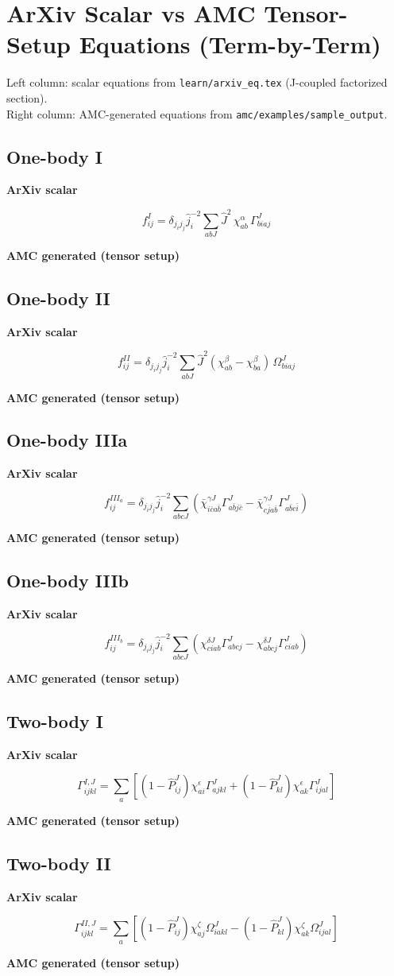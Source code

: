 \documentclass[11pt]{article}
\newcommand{\CompareBlock}[3]{%
\subsection*{#1}
\noindent
\begin{minipage}[t]{0.48\textwidth}
\textbf{ArXiv scalar}
#2
\end{minipage}\hfill
\begin{minipage}[t]{0.48\textwidth}
\textbf{AMC generated (tensor setup)}

\end{minipage}
\vspace{1em}
}
\begin{document}
\small

\section*{ArXiv Scalar vs AMC Tensor-Setup Equations (Term-by-Term)}

Left column: scalar equations from \texttt{learn/arxiv_eq.tex} (J-coupled factorized section).\\
Right column: AMC-generated equations from \texttt{amc/examples/sample_output}.

\CompareBlock{One-body I}{
\begin{equation*}
 f^{I}_{ij}=\delta_{j_i j_j}\hat j_i^{-2}\sum_{abJ}\hat J^2\,\chi^{\alpha}_{ab}\,\Gamma^J_{biaj}
\end{equation*}
}{amc_eq_snippets_clean/dc_f1_tensor_clean_body.tex}

\CompareBlock{One-body II}{
\begin{equation*}
 f^{II}_{ij}=\delta_{j_i j_j}\hat j_i^{-2}\sum_{abJ}\hat J^2(\chi^{\beta}_{ab}-\chi^{\beta}_{ba})\,\Omega^J_{biaj}
\end{equation*}
}{amc_eq_snippets_clean/dc_f2_tensor_clean_body.tex}

\CompareBlock{One-body IIIa}{
\begin{equation*}
 f^{III_a}_{ij}=\delta_{j_i j_j}\hat j_i^{-2}\sum_{abcJ}
\left(\bar\chi^{\gamma J}_{i\bar c a\bar b}\Gamma^J_{a\bar b j\bar c}-\bar\chi^{\gamma J}_{c\bar j a\bar b}\Gamma^J_{a\bar b c\bar i}\right)
\end{equation*}
}{amc_eq_snippets_clean/dc_f3a_tensor_clean_body.tex}

\CompareBlock{One-body IIIb}{
\begin{equation*}
 f^{III_b}_{ij}=\delta_{j_i j_j}\hat j_i^{-2}\sum_{abcJ}
\left(\chi^{\delta J}_{ciab}\Gamma^J_{abcj}-\chi^{\delta J}_{abcj}\Gamma^J_{ciab}\right)
\end{equation*}
}{amc_eq_snippets_clean/dc_f3b_tensor_body.tex}

\CompareBlock{Two-body I}{
\begin{equation*}
\Gamma^{I,J}_{ijkl}=\sum_a\left[(1-\hat P^J_{ij})\chi^{\epsilon}_{ai}\Gamma^J_{ajkl}+(1-\hat P^J_{kl})\chi^{\epsilon}_{ak}\Gamma^J_{ijal}\right]
\end{equation*}
}{amc_eq_snippets_clean/dc_G1_tensor_clean_body.tex}

\CompareBlock{Two-body II}{
\begin{equation*}
\Gamma^{II,J}_{ijkl}=\sum_a\left[(1-\hat P^J_{ij})\chi^{\zeta}_{aj}\Omega^J_{iakl}-(1-\hat P^J_{kl})\chi^{\zeta}_{ak}\Omega^J_{ijal}\right]
\end{equation*}
}{amc_eq_snippets_clean/dc_G2_tensor_clean_body.tex}
\end{document}
